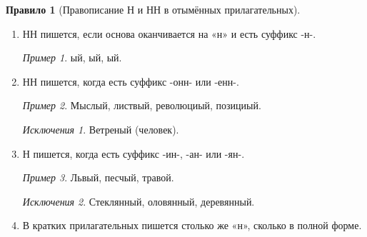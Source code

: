 \documentclass[12pt]{article}
\theoremstyle{definition}
\newtheorem{rrule}{Правило}[section]
\theoremstyle{remark}
\newtheorem*{example}{Пример}
\newtheorem*{exception}{Исключения}
\begin{document}
\begin{rrule}[Правописание Н и НН в отымённых прилагательных]
    \hfill
    \begin{enumerate}
        \item НН пишется, если основа оканчивается на «н» и есть суффикс -н-.
        \begin{example}
            ый, ый, ый.
        \end{example}
        \item НН пишется, когда есть суффикс -онн- или -енн-.
        \begin{example}
            Мыслый, листвый, революциый, позициый.
        \end{example}
        \begin{exception}
            Ветреный (человек).
        \end{exception}
        \item Н пишется, когда есть суффикс -ин-, -ан- или -ян-.
        \begin{example}
            Львый, песчый, травой.
        \end{example}
        \begin{exception}
            Стеклянный, оловянный, деревянный.
        \end{exception}
        \item В кратких прилагательных пишется столько же «н», сколько в полной форме.
    \end{enumerate}
\end{rrule}
\end{document}
